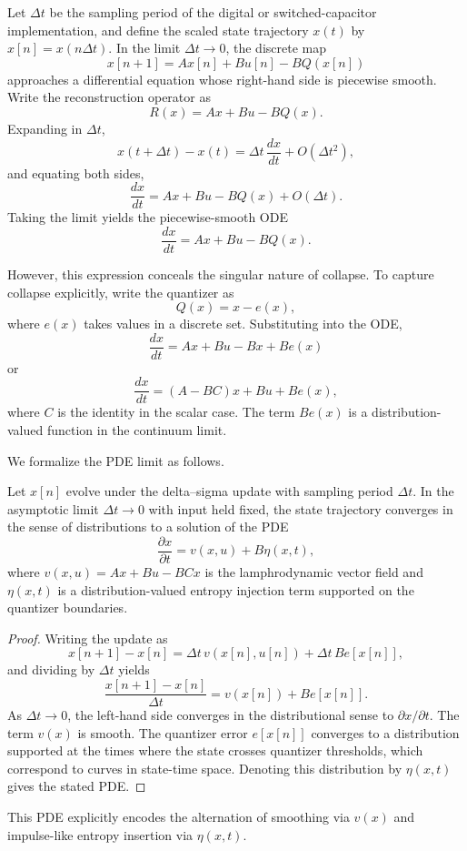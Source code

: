 Let $\Delta t$ be the sampling period of the digital or switched-capacitor implementation, and define the scaled state trajectory $x(t)$ by $x[n] = x(n \Delta t)$. In the limit $\Delta t \to 0$, the discrete map
\[
x[n+1] = A x[n] + B u[n] - B Q(x[n])
\]
approaches a differential equation whose right-hand side is piecewise smooth. Write the reconstruction operator as
\[
R(x) = A x + B u - B Q(x).
\]
Expanding in $\Delta t$,
\[
x(t+\Delta t) - x(t) = \Delta t \, \frac{dx}{dt} + O(\Delta t^{2}),
\]
and equating both sides,
\[
\frac{dx}{dt} = A x + B u - B Q(x) + O(\Delta t).
\]
Taking the limit yields the piecewise-smooth ODE
\[
\frac{dx}{dt} = A x + B u - B Q(x).
\]

However, this expression conceals the singular nature of collapse. To capture collapse explicitly, write the quantizer as
\[
Q(x) = x - e(x),
\]
where $e(x)$ takes values in a discrete set. Substituting into the ODE,
\[
\frac{dx}{dt} = A x + B u - B x + B e(x)
\]
or
\[
\frac{dx}{dt} = (A - B C)x + B u + B e(x),
\]
where $C$ is the identity in the scalar case. The term $B e(x)$ is a distribution-valued function in the continuum limit.

We formalize the PDE limit as follows.

\begin{theorem}
Let $x[n]$ evolve under the delta--sigma update with sampling period $\Delta t$. In the asymptotic limit $\Delta t \to 0$ with input held fixed, the state trajectory converges in the sense of distributions to a solution of the PDE
\[
\frac{\partial x}{\partial t} = v(x,u) + B \eta(x,t),
\]
where $v(x,u) = A x + B u - B C x$ is the lamphrodynamic vector field and $\eta(x,t)$ is a distribution-valued entropy injection term supported on the quantizer boundaries.
\end{theorem}

\begin{proof}
Writing the update as
\[
x[n+1] - x[n] = \Delta t \, v(x[n],u[n]) + \Delta t \, B e[x[n]],
\]
and dividing by $\Delta t$ yields
\[
\frac{x[n+1] - x[n]}{\Delta t} = v(x[n]) + B e[x[n]].
\]
As $\Delta t \to 0$, the left-hand side converges in the distributional sense to $\partial x / \partial t$. The term $v(x)$ is smooth. The quantizer error $e[x[n]]$ converges to a distribution supported at the times where the state crosses quantizer thresholds, which correspond to curves in state-time space. Denoting this distribution by $\eta(x,t)$ gives the stated PDE.
\end{proof}

This PDE explicitly encodes the alternation of smoothing via $v(x)$ and impulse-like entropy insertion via $\eta(x,t)$.

